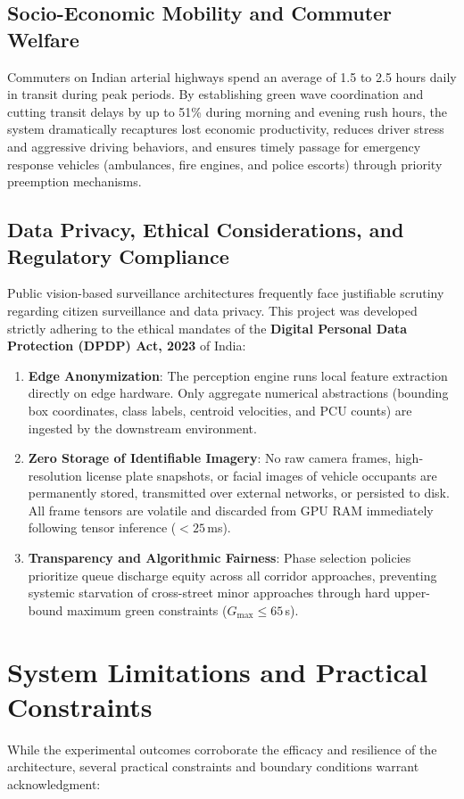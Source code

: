 \documentclass[12pt,a4paper,oneside]{report}
\begin{document}
\subsection{Socio-Economic Mobility and Commuter Welfare}
Commuters on Indian arterial highways spend an average of 1.5 to 2.5 hours daily in transit during peak periods. By establishing green wave coordination and cutting transit delays by up to 51\% during morning and evening rush hours, the system dramatically recaptures lost economic productivity, reduces driver stress and aggressive driving behaviors, and ensures timely passage for emergency response vehicles (ambulances, fire engines, and police escorts) through priority preemption mechanisms.

\subsection{Data Privacy, Ethical Considerations, and Regulatory Compliance}
Public vision-based surveillance architectures frequently face justifiable scrutiny regarding citizen surveillance and data privacy. This project was developed strictly adhering to the ethical mandates of the \textbf{Digital Personal Data Protection (DPDP) Act, 2023} of India:
\begin{enumerate}
    \item \textbf{Edge Anonymization}: The perception engine runs local feature extraction directly on edge hardware. Only aggregate numerical abstractions (bounding box coordinates, class labels, centroid velocities, and PCU counts) are ingested by the downstream environment.
    \item \textbf{Zero Storage of Identifiable Imagery}: No raw camera frames, high-resolution license plate snapshots, or facial images of vehicle occupants are permanently stored, transmitted over external networks, or persisted to disk. All frame tensors are volatile and discarded from GPU RAM immediately following tensor inference ($< 25$\,ms).
    \item \textbf{Transparency and Algorithmic Fairness}: Phase selection policies prioritize queue discharge equity across all corridor approaches, preventing systemic starvation of cross-street minor approaches through hard upper-bound maximum green constraints ($G_{\max} \le 65$\,s).
\end{enumerate}

\section{System Limitations and Practical Constraints}
\label{sec:limitations}
While the experimental outcomes corroborate the efficacy and resilience of the architecture, several practical constraints and boundary conditions warrant acknowledgment:
\end{document}
